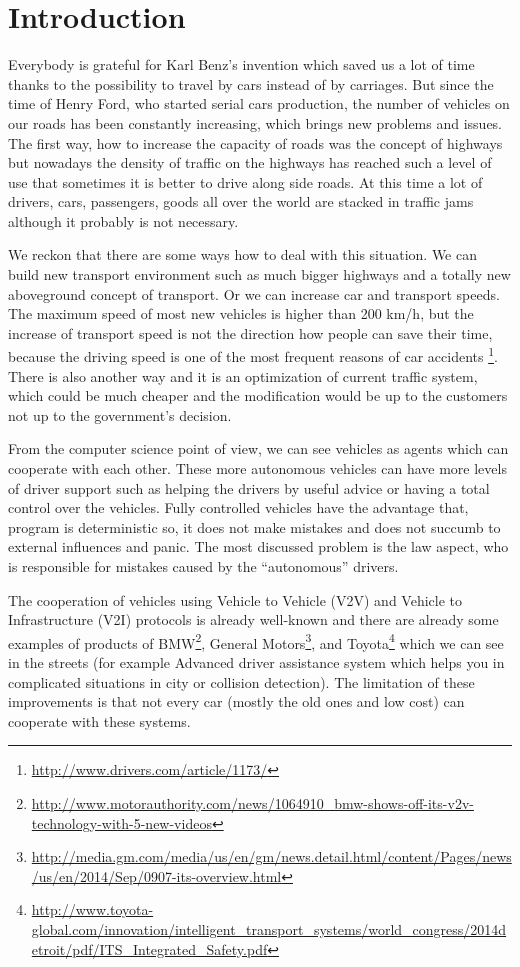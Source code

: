 \chapter{Introduction}
Everybody is grateful for Karl Benz's invention which saved us a lot of time thanks to the possibility to travel by cars instead of by carriages. But since the time of Henry Ford, who started serial cars production, the number of vehicles on our roads has been constantly increasing, which brings new problems and issues. The first way, how to increase the capacity of roads was the concept of highways but nowadays the density of traffic on the highways has reached such a level of use that sometimes it is better to drive along side roads. At this time a lot of drivers, cars, passengers, goods all over the world are stacked  in traffic jams although it probably is not necessary. 

We reckon that there are some ways how to deal with this situation. We can build new transport environment such as much bigger highways and a totally new aboveground concept of transport. Or we can increase car and transport speeds. The maximum speed of most new vehicles is higher than 200 km/h, but the increase of transport speed is not the direction how people can save their time, because the driving speed is one of the most frequent reasons of car accidents \footnote{\url{http://www.drivers.com/article/1173/}}. There is also another way and it is an optimization of current traffic system, which could be much cheaper and the modification would be up to the customers not up to the government's decision.

From the computer science point of view, we can see vehicles as agents which can cooperate with each other. These more autonomous vehicles can have more levels of driver support such as helping the drivers by useful advice or having a total control over the vehicles. Fully controlled vehicles have the advantage that, program is deterministic so, it does not make mistakes and does not succumb to external influences and panic. The most discussed problem is the law aspect, who is responsible for mistakes caused by the “autonomous” drivers. 

The cooperation of vehicles using Vehicle to Vehicle (V2V) and Vehicle to Infrastructure (V2I) protocols is already well-known and there are already some examples of products of BMW\footnote{\url{http://www.motorauthority.com/news/1064910_bmw-shows-off-its-v2v-technology-with-5-new-videos}}, General Motors\footnote{\url{http://media.gm.com/media/us/en/gm/news.detail.html/content/Pages/news/us/en/2014/Sep/0907-its-overview.html}}, and Toyota\footnote{\url{http://www.toyota-global.com/innovation/intelligent_transport_systems/world_congress/2014detroit/pdf/ITS_Integrated_Safety.pdf}} which we can see in the streets (for example Advanced driver assistance system which helps you in complicated situations in city or collision detection). The limitation of these improvements is that not every car (mostly the old ones and low cost) can cooperate with these systems.

